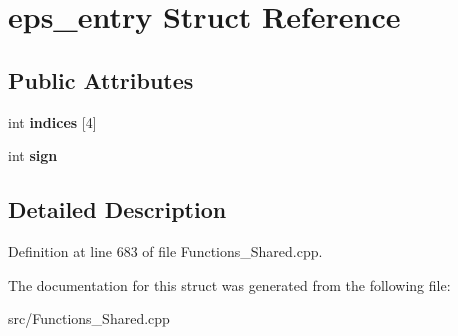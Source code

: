 \hypertarget{structeps__entry}{\section{eps\-\_\-entry Struct Reference}
\label{structeps__entry}
}
\subsection*{Public Attributes}
\begin{DoxyCompactItemize}
\item 
\hypertarget{structeps__entry_aeb23818a8c93790dc84e159e22fece7c}{int {\bfseries indices} \mbox{[}4\mbox{]}}\label{structeps__entry_aeb23818a8c93790dc84e159e22fece7c}

\item 
\hypertarget{structeps__entry_a6557cf0ea08b5afe0e6f525e13934712}{int {\bfseries sign}}\label{structeps__entry_a6557cf0ea08b5afe0e6f525e13934712}

\end{DoxyCompactItemize}


\subsection{Detailed Description}


Definition at line 683 of file Functions\-\_\-\-Shared.\-cpp.



The documentation for this struct was generated from the following file\-:\begin{DoxyCompactItemize}
\item 
src/Functions\-\_\-\-Shared.\-cpp\end{DoxyCompactItemize}
